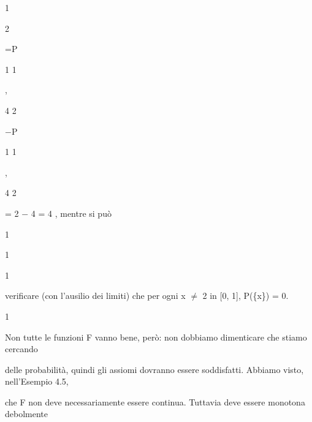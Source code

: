 \documentclass[a4paper,portrait,12pt]{article}
\begin{document}
1


2





\begin{flushleft}
=P
\end{flushleft}





1 1


,


4 2





\begin{flushleft}
$-$P
\end{flushleft}





1 1


,


4 2





\begin{flushleft}
= 2 $-$ 4 = 4 , mentre si pu\`{o}
\end{flushleft}


1





1





1





\begin{flushleft}
verificare (con l'ausilio dei limiti) che per ogni x $\neq$ 2 in [0, 1], P(\{x\}) = 0.
\end{flushleft}


1





\begin{flushleft}
Non tutte le funzioni F vanno bene, per\`{o}: non dobbiamo dimenticare che stiamo cercando
\end{flushleft}


\begin{flushleft}
delle probabilit\`{a}, quindi gli assiomi dovranno essere soddisfatti. Abbiamo visto, nell'Esempio 4.5,
\end{flushleft}


\begin{flushleft}
che F non deve necessariamente essere continua. Tuttavia deve essere monotona debolmente
\end{flushleft}
\end{document}
